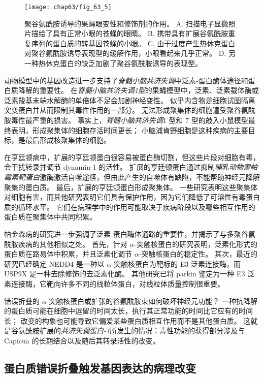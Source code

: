 \begin{figure}[htbp]
	\centering
	\texttt{[image: chap63/fig\_63\_5]}
	\caption{聚谷氨酰胺诱导的果蝇眼变性和修饰剂的作用。 
		A. 扫描电子显微照片描绘了具有正常小眼的苍蝇的眼睛。
		B. 携带具有扩展谷氨酰胺重复序列的蛋白质的转基因苍蝇的小眼。
		C. 由于过度产生热休克蛋白对聚谷氨酰胺诱导表现型的缓解作用，小眼看起来几乎正常。
		D. 另一种热休克蛋白的缺乏加剧了聚谷氨酰胺诱导的表现型。}
	\label{fig:63_5}
\end{figure}


动物模型中的基因改造进一步支持了\textit{脊髓小脑共济失调}中泛素-蛋白酶体途径和蛋白质降解的重要性。
在\textit{脊髓小脑共济失调1型}的果蝇模型中，泛素、泛素载体酶或泛素羧基末端水解酶的单倍体不足会加剧神经变性。
似乎内含物是细胞试图隔离突变蛋白并从而限制其毒性作用的一部分。
无法形成聚集体的细胞遭受聚谷氨酰胺毒性最严重的损害。
事实上，\textit{脊髓小脑共济失调}1 型和 7 型的敲入小鼠模型最终表明，形成聚集体的细胞存活时间更长；
小脑浦肯野细胞是这种疾病的主要目标，是最后形成核聚集体的细胞。


在亨廷顿病中，扩展的亨廷顿蛋白很容易被蛋白酶切割，但这些片段对细胞有毒，会干扰转录并调节 dynamin-1 的活性。
扩展的亨廷顿蛋白通过抑制\textit{哺乳动物雷帕霉素靶蛋白}激酶激活自噬途径，但由此产生的自噬体有缺陷，不能帮助神经元降解聚集的蛋白质。
最后，扩展的亨廷顿蛋白形成聚集体。
一些研究表明这些聚集体对细胞有害，而其他研究表明它们具有保护作用，因为它们降低了可溶性有毒蛋白质的循环水平。
它们在病理学中的作用可能取决于疾病阶段以及哪些相互作用的蛋白质在聚集体中共同积累。


帕金森病的研究进一步强调了泛素-蛋白酶体通路的重要性，并揭示了与多聚谷氨酰胺疾病的其他相似之处。
首先，针对 $\alpha$-突触核蛋白的研究表明，泛素化形式的蛋白质在路易体中积累，并且泛素化调节 $\alpha$-突触核蛋白的稳定性。
其次，最近的研究已经确定 NEDD4 是一种以 $\alpha$-突触核蛋白为靶标的 E3 泛素连接酶，而 USP9X 是一种去除修饰的去泛素化酶。
其他研究已将 parkin 鉴定为一种 E3 泛素连接酶，它靶向许多不同的线粒体蛋白，对线粒体质量控制很重要。


错误折叠的 $\alpha$-突触核蛋白或扩张的谷氨酰胺束如何破坏神经元功能？
一种抗降解的蛋白质可能在细胞中逗留的时间太长，执行其正常功能的时间比它应有的时间长；
改变的构象也可能导致它偏爱某些蛋白质相互作用而不是其他蛋白质。
这就是谷氨酰胺扩展的\textit{共济失调蛋白-1}所发生的情况：毒性功能的获得部分涉及与 Capicua 的长期结合以及随后其转录活性的改变。



\subsection{蛋白质错误折叠触发基因表达的病理改变}

